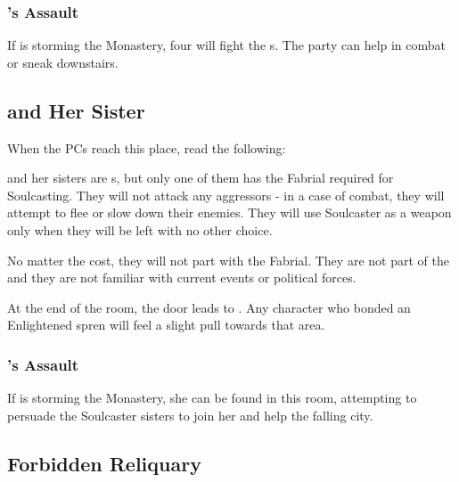\subsubsection{\npcHighmarshalName{}'s Assault}

If \npcHighmarshal{} is storming the Monastery, four \enemyWallGuard{} will fight the \enemyCultist{}s. The party can help in combat or sneak downstairs.




\subsection{\npcSoulcasterName{} and Her Sister}
\label{ssec:monasterySoulcasters}

When the PCs reach this place, read the following:


\npcSoulcaster{} and her sisters are \enemySoulcaster{}s, but only one of them has the Fabrial required for Soulcasting. They will not attack any aggressors - in a case of combat, they will attempt to flee or slow down their enemies. They will use Soulcaster as a weapon only when they will be left with no other choice.

No matter the cost, they will not part with the Fabrial. They are not part of the \npcFractionCult{} and they are not familiar with current events or political forces.

At the end of the room, the door leads to . Any character who bonded an Enlightened spren will feel a slight pull towards that area.


\subsubsection{\npcHighmarshalName{}'s Assault}

If \npcHighmarshal{} is storming the Monastery, she can be found in this room, attempting to persuade the Soulcaster sisters to join her and help the falling city.




\subsection{Forbidden Reliquary}
\label{ssec:monasteryReliquary}

